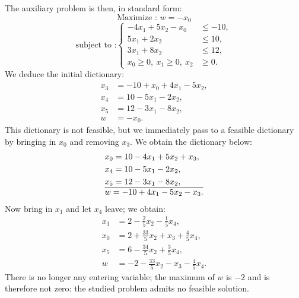 \begin{example}
    The auxiliary problem is then, in standard form:
    \[
        \text{Maximize : } w = -x_0
    \]
    \[
        \text{subject to :}
        \left\{
        \begin{aligned}
            -4x_1 + 5x_2 - x_0 &\leqslant -10,\\
            5x_1 + 2x_2 &\leqslant 10,\\
            3x_1 + 8x_2 &\leqslant 12,\\
            x_0 \ge 0,\ x_1 \ge 0,\ x_2 &\ge 0.
        \end{aligned}
        \right.
    \]
    We deduce the initial dictionary:
    \[
        \begin{aligned}
        x_3 &= -10 + x_0 + 4x_1 - 5x_2,\\
        x_4 &= 10 - 5x_1 - 2x_2,\\
        x_5 &= 12 - 3x_1 - 8x_2,\\
        \hline
        w &= -x_0.
        \end{aligned}
    \]
    This dictionary is not feasible, but we immediately pass to a feasible dictionary by bringing in \(x_0\) and removing \(x_3\). We obtain the dictionary below:
    \[
        \begin{aligned}
        &x_0 = 10 - 4x_1 + 5x_2 + x_3,\\
        &x_4 = 10 - 5x_1 - 2x_2,\\
        &x_5 = 12 - 3x_1 - 8x_2, \\
        \hline
        &w = -10 + 4x_1 - 5x_2 - x_3.
        \end{aligned}
    \]
    Now bring in \(x_1\) and let \(x_4\) leave; we obtain:
    \[
        \begin{aligned}
        x_1 &= 2 - \tfrac{2}{5}x_2 - \tfrac{1}{5}x_4,\\
        x_0 &= 2 + \tfrac{33}{5}x_2 + x_3 + \tfrac{4}{5}x_4,\\
        x_5 &= 6 - \tfrac{34}{5}x_2 + \tfrac{3}{5}x_4,\\
        \hline
        w &= -2 - \tfrac{33}{5}x_2 - x_3 - \tfrac{4}{5}x_4.
        \end{aligned}
    \]
    There is no longer any entering variable; the maximum of \(w\) is \(-2\) and is therefore not zero: the studied problem admits no feasible solution.
\end{example}

